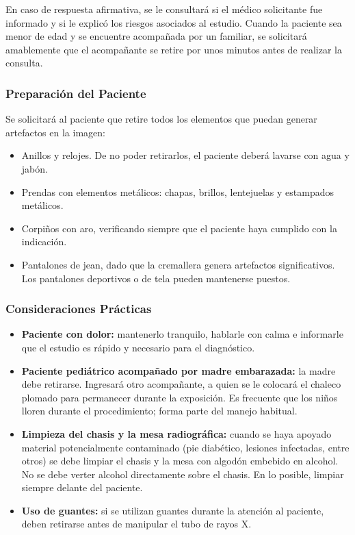 	En caso de respuesta afirmativa, se le consultará si el médico solicitante fue informado y si le explicó los riesgos asociados al estudio. Cuando la paciente sea menor de edad y se encuentre acompañada por un familiar, se solicitará amablemente que el acompañante se retire por unos minutos antes de realizar la consulta.
	
	\subsubsection*{Preparación del Paciente}
	
	Se solicitará al paciente que retire todos los elementos que puedan generar artefactos en la imagen:
	\begin{itemize}
		\item Anillos y relojes. De no poder retirarlos, el paciente deberá lavarse con agua y jabón.
		\item Prendas con elementos metálicos: chapas, brillos, lentejuelas y estampados metálicos.
		\item Corpiños con aro, verificando siempre que el paciente haya cumplido con la indicación.
		\item Pantalones de jean, dado que la cremallera genera artefactos significativos. Los pantalones deportivos o de tela pueden mantenerse puestos.
	\end{itemize}
	
	\subsubsection*{Consideraciones Prácticas}
	
	\begin{itemize}
		\item \textbf{Paciente con dolor:} mantenerlo tranquilo, hablarle con calma e informarle que el estudio es rápido y necesario para el diagnóstico.
		\item \textbf{Paciente pediátrico acompañado por madre embarazada:} la madre debe retirarse. Ingresará otro acompañante, a quien se le colocará el chaleco plomado para permanecer durante la exposición. Es frecuente que los niños lloren durante el procedimiento; forma parte del manejo habitual.
		\item \textbf{Limpieza del chasis y la mesa radiográfica:} cuando se haya apoyado material potencialmente contaminado (pie diabético, lesiones infectadas, entre otros) se debe limpiar el chasis y la mesa con algodón embebido en alcohol. No se debe verter alcohol directamente sobre el chasis. En lo posible, limpiar siempre delante del paciente.
		\item \textbf{Uso de guantes:} si se utilizan guantes durante la atención al paciente, deben retirarse antes de manipular el tubo de rayos X.
	\end{itemize}
	
